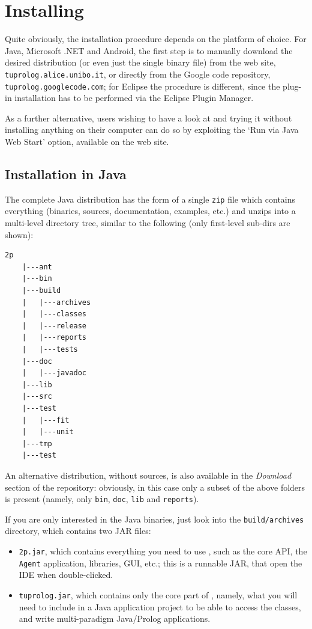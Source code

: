 \chapter{Installing \tuprolog{}}
\label{installation}

Quite obviously, the installation procedure depends on the platform of choice.
For Java, Microsoft .NET and Android, the first step is to manually download the desired distribution (or even just the single binary file) from the \tuprolog{} web site, \texttt{tuprolog.alice.unibo.it}, or directly from the Google code repository, \texttt{tuprolog.googlecode.com}; for Eclipse the procedure is different, since the plug-in installation has to be performed via the Eclipse Plugin Manager.

As a further alternative, users wishing to have a look at \tuprolog{} and trying it without installing anything on their computer can do so by exploiting the `Run via Java Web Start' option, available on the \tuprolog{} web site.

\section{Installation in Java}

The complete Java distribution has the form of a single \texttt{zip} file which contains everything (binaries, sources, documentation, examples, etc.) and unzips into a multi-level directory tree, similar to the following (only first-level sub-dirs are shown):

\begin{Verbatim}[frame=single, framerule=0.5mm, samepage=true, boxwidth=5cm]
    2p
    |---ant
    |---bin
    |---build
    |   |---archives
    |   |---classes
    |   |---release
    |   |---reports
    |   |---tests
    |---doc
    |   |---javadoc
    |---lib
    |---src
    |---test
    |   |---fit
    |   |---unit
    |---tmp
    |---test
\end{Verbatim}

An alternative distribution, without sources, is also available in the \textit{Download} section of the \tuprolog{} repository: obviously, in this case only a subset of the above folders is present (namely, only \texttt{bin}, \texttt{doc}, \texttt{lib} and \texttt{reports}).

If you are only interested in the Java binaries, just look into the \texttt{build/archives} directory, which contains two JAR files:
%
\begin{itemize}
%
\item \texttt{2p.jar}, which contains everything you need to use \tuprolog{},
  such as the core API, the \texttt{Agent} application, libraries, GUI,
  etc.; this is a runnable JAR, that open the \tuprolog{} IDE when double-clicked.
%
\item \texttt{tuprolog.jar}, which contains only the core part of \tuprolog{},
  namely, what you will need to include in a Java application project to be able to access the \tuprolog{} classes, and write multi-paradigm Java/Prolog applications.
\end{itemize}

